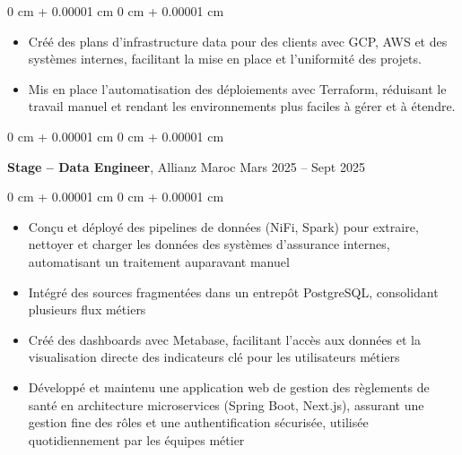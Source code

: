 \documentclass[10pt, letterpaper]{article}
\newenvironment{highlights}{
    \begin{itemize}[
        topsep=0.10 cm,
        parsep=0.10 cm,
        partopsep=0pt,
        itemsep=0pt,
        leftmargin=0 cm + 10pt
    ]
}{
    \end{itemize}
} %
\newenvironment{onecolentry}{
    \begin{adjustwidth}{
        0 cm + 0.00001 cm
    }{
        0 cm + 0.00001 cm
    }
}{
    \end{adjustwidth}
} %
\newenvironment{twocolentry}[2][]{
    \onecolentry
    \def\secondColumn{#2}
    \setcolumnwidth{\fill, 4.5 cm}
    \begin{paracol}{2}
}{
    \switchcolumn \raggedleft \secondColumn
    \end{paracol}
    \endonecolentry
} %
\begin{document}
        \vspace{0.10 cm}
        \begin{onecolentry}
            \begin{highlights}
                \item Créé des plans d’infrastructure data pour des clients avec GCP, AWS et des systèmes internes, facilitant la mise en place et l’uniformité des projets.  
                \item Mis en place l’automatisation des déploiements avec Terraform, réduisant le travail manuel et rendant les environnements plus faciles à gérer et à étendre.  

            \end{highlights}
        \end{onecolentry}


        \vspace{0.2 cm}
        
        \begin{twocolentry}{
            Mars 2025 – Sept 2025
        }
            \textbf{Stage – Data Engineer}, Allianz Maroc \end{twocolentry}

        \vspace{0.10 cm}
        \begin{onecolentry}
            \begin{highlights}
                \item Conçu et déployé des pipelines de données (NiFi, Spark) pour extraire, nettoyer et charger les données des systèmes d’assurance internes, automatisant un traitement auparavant manuel
                \item Intégré des sources fragmentées dans un entrepôt PostgreSQL, consolidant plusieurs flux métiers
                \item Créé des dashboards avec Metabase, facilitant l’accès aux données et la visualisation directe des indicateurs clé pour les utilisateurs métiers
                \item Développé et maintenu une application web de gestion des règlements de santé en architecture microservices (Spring Boot, Next.js), assurant une gestion fine des rôles et une authentification sécurisée, utilisée quotidiennement par les équipes métier

            \end{highlights}
        \end{onecolentry}


        \vspace{0.2 cm}
        
\end{document}
